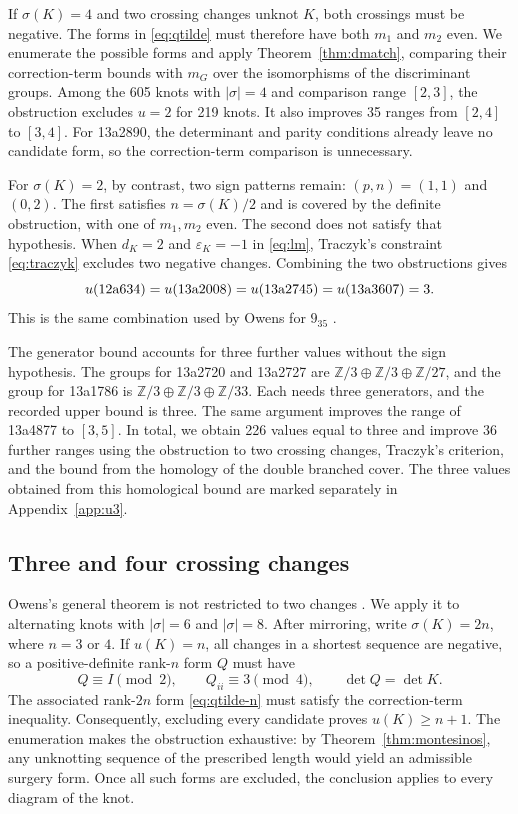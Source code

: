 \documentclass[12pt, oneside]{amsart}
\newcommand{\bbz}{{\mathbb Z}}
\newcommand{\kn}[2]{\textup{#1#2}}
\newcommand{\nSigFourImproved}{35}
\newcommand{\nSigFourObstructed}{219}
\newcommand{\nSigFourOpen}{605}
\newcommand{\nUthreeOwens}{226}
\begin{document}
If $\sigma(K)=4$ and two crossing changes unknot $K$, both crossings must be negative.
The forms in \eqref{eq:qtilde} must therefore have both $m_1$ and $m_2$ even. We enumerate
the possible forms and apply Theorem~\ref{thm:dmatch}, comparing their
correction-term bounds with $m_G$ over the isomorphisms of the discriminant
groups. Among the \nSigFourOpen{} knots with
$|\sigma|=4$ and comparison range $[2,3]$, the obstruction excludes $u=2$ for
\nSigFourObstructed{} knots. It also improves \nSigFourImproved{} ranges from $[2,4]$
to $[3,4]$. For \kn{13a}{2890}, the determinant and parity conditions already leave
no candidate form, so the correction-term comparison is unnecessary.

For $\sigma(K)=2$, by contrast, two sign patterns remain: $(p,n)=(1,1)$ and $(0,2)$.
The first satisfies $n=\sigma(K)/2$ and is covered by the definite obstruction, with
one of $m_1,m_2$ even. The second does not satisfy that hypothesis. When
$d_K=2$ and $\varepsilon_K=-1$ in \eqref{eq:lm}, Traczyk's constraint
\eqref{eq:traczyk} excludes two negative changes. Combining the two obstructions gives
\[
    u(\kn{12a}{634})=u(\kn{13a}{2008})
    =u(\kn{13a}{2745})=u(\kn{13a}{3607})=3.
\]
This is the same combination used by Owens for $9_{35}$ \cite{Owens}.

The generator bound accounts for three further values without the sign hypothesis.
The groups for \kn{13a}{2720} and \kn{13a}{2727} are
$\bbz/3\oplus\bbz/3\oplus\bbz/27$, and the group for \kn{13a}{1786} is
$\bbz/3\oplus\bbz/3\oplus\bbz/33$. Each needs three generators, and the recorded
upper bound is three. The same argument improves the range of \kn{13a}{4877} to
$[3,5]$. In total, we obtain \nUthreeOwens{} values equal to three and improve $36$ further
ranges using the obstruction to two crossing changes, Traczyk's criterion, and the bound from the homology of the double branched cover. The three values
obtained from this homological bound are marked separately in Appendix~\ref{app:u3}.

\subsection{Three and four crossing changes}\label{sec:higher}

Owens's general theorem is not restricted to two changes \cite[Thm.~5]{Owens}.
We apply it to alternating knots with $|\sigma|=6$ and $|\sigma|=8$.
After mirroring, write $\sigma(K)=2n$, where $n=3$ or $4$. If $u(K)=n$, all changes
in a shortest sequence are negative, so a positive-definite rank-$n$ form $Q$ must have
\[
    Q\equiv I\pmod2,\qquad Q_{ii}\equiv3\pmod4,\qquad
    \det Q=\det K.
\]
The associated rank-$2n$ form \eqref{eq:qtilde-n} must satisfy the correction-term
inequality. Consequently, excluding every candidate proves $u(K)\ge n+1$.
The enumeration makes the obstruction exhaustive: by Theorem~\ref{thm:montesinos},
any unknotting sequence of the prescribed length would yield an admissible surgery
form. Once all such forms are excluded, the conclusion applies to every diagram of
the knot.
\end{document}
